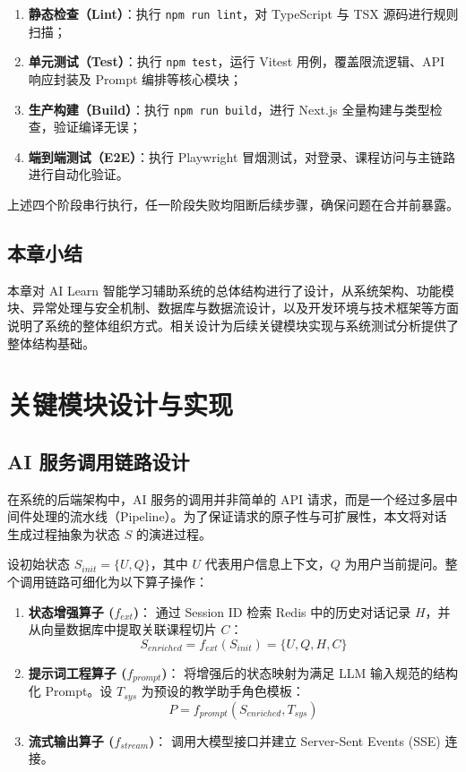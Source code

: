 \documentclass[12pt,a4paper,oneside]{ctexbook}
\numberwithin{equation}{chapter}
\begin{document}
\begin{enumerate}
  \item \textbf{静态检查（Lint）}：执行 \texttt{npm run lint}，对 TypeScript 与 TSX 源码进行规则扫描；
  \item \textbf{单元测试（Test）}：执行 \texttt{npm test}，运行 Vitest 用例，覆盖限流逻辑、API 响应封装及 Prompt 编排等核心模块；
  \item \textbf{生产构建（Build）}：执行 \texttt{npm run build}，进行 Next.js 全量构建与类型检查，验证编译无误；
  \item \textbf{端到端测试（E2E）}：执行 Playwright 冒烟测试，对登录、课程访问与主链路进行自动化验证。
\end{enumerate}

上述四个阶段串行执行，任一阶段失败均阻断后续步骤，确保问题在合并前暴露。

\section{本章小结}

本章对 AI Learn 智能学习辅助系统的总体结构进行了设计，从系统架构、功能模块、异常处理与安全机制、数据库与数据流设计，以及开发环境与技术框架等方面说明了系统的整体组织方式。相关设计为后续关键模块实现与系统测试分析提供了整体结构基础。

\chapter{关键模块设计与实现}

\section{AI 服务调用链路设计}
在系统的后端架构中，AI 服务的调用并非简单的 API 请求，而是一个经过多层中间件处理的流水线（Pipeline）。为了保证请求的原子性与可扩展性，本文将对话生成过程抽象为状态 $S$ 的演进过程。

设初始状态 $S_{init} = \{U, Q\}$，其中 $U$ 代表用户信息上下文，$Q$ 为用户当前提问。整个调用链路可细化为以下算子操作：
\begin{enumerate}
    \item \textbf{状态增强算子 ($f_{ext}$)}：
    通过 Session ID 检索 Redis 中的历史对话记录 $H$，并从向量数据库中提取关联课程切片 $C$：
    \begin{equation}
    S_{enriched} = f_{ext}(S_{init}) = \{U, Q, H, C\}
    \end{equation}
    
    \item \textbf{提示词工程算子 ($f_{prompt}$)}：
    将增强后的状态映射为满足 LLM 输入规范的结构化 Prompt。设 $T_{sys}$ 为预设的教学助手角色模板：
    \begin{equation}
    P = f_{prompt}(S_{enriched}, T_{sys})
    \end{equation}
    
    \item \textbf{流式输出算子 ($f_{stream}$)}：
    调用大模型接口并建立 Server-Sent Events (SSE) 连接。
\end{enumerate}
\end{document}
